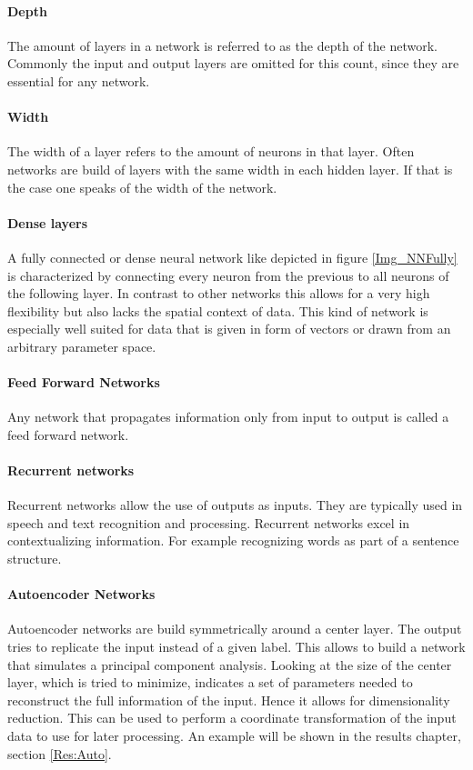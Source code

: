 			\paragraph{Depth}
			The amount of layers in a network is referred to as the depth of the network. Commonly the input and output layers are omitted for this count, since they are essential for any network.
			\paragraph{Width}
			The width of a layer refers to the amount of neurons in that layer. Often networks are build of layers with the same width in each hidden layer. If that is the case one speaks of the width of the network.
			\paragraph{Dense layers}
			A fully connected or dense neural network like depicted in figure \ref{Img_NNFully} is characterized by connecting every neuron from the previous to all neurons of the following layer. In contrast to other networks this allows for a very high flexibility but also lacks the spatial context of data. This kind of network is especially well suited for data that is given in form of vectors or drawn from an arbitrary parameter space.
			\paragraph{Feed Forward Networks}
			Any network that propagates information only from input to output is called a feed forward network.
			\paragraph{Recurrent networks} Recurrent networks allow the use of outputs as inputs. They are typically used in speech and text recognition and processing. Recurrent networks excel in contextualizing information. For example recognizing words as part of a sentence structure.
			\paragraph{Autoencoder Networks}
				Autoencoder networks are build symmetrically around a center layer. The output tries to replicate the input instead of a given label. This allows to build a network that simulates a principal component analysis. Looking at the size of the center layer, which is tried to minimize, indicates a set of parameters needed to reconstruct the full information of the input. Hence it allows for dimensionality reduction. This can be used to perform a coordinate transformation of the input data to use for later processing. An example will be shown in the results chapter, section \ref{Res:Auto}.
